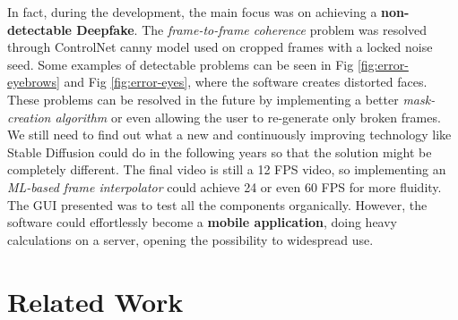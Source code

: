 \documentclass[preprint]{elsarticle}
\begin{document}
In fact, during the development, the main focus was on achieving a \textbf{non-detectable Deepfake}. 
The \emph{frame-to-frame coherence} problem was resolved through ControlNet 
canny model used on cropped frames with a locked noise seed. 
Some examples of detectable problems can be seen in Fig \ref{fig:error-eyebrows} and Fig \ref{fig:error-eyes}, 
where the software creates distorted faces. 
These problems can be resolved in the future by implementing a better 
\emph{mask-creation algorithm} or even allowing the user to re-generate only broken frames.
We still need to find out what a new and continuously improving technology like 
Stable Diffusion could do in the following years so that the solution might be completely different. 
The final video is still a 12 FPS video, so implementing an \emph{ML-based frame interpolator} could achieve 
24 or even 60 FPS for more fluidity. 
The GUI presented was to test all the components organically. 
However, the software could effortlessly become a \textbf{mobile application}, 
doing heavy calculations on a server, opening the possibility to widespread use.


\section{Related Work}\label{sect:related}
\end{document}
